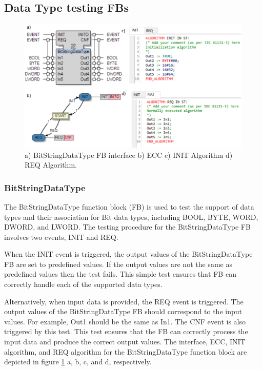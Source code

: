 \documentclass[conference]{IEEEtran}
\begin{document}
\subsection{Data Type testing FBs}
\begin{figure}[!b]
    \centering
    \includegraphics[width=\columnwidth]{Figures/BSDT.PNG}
    \caption{a) BitStringDataType FB interface b) ECC c) INIT Algorithm d) REQ Algorithm.} 
    \label{fig:BSDT}
\end{figure}



\subsubsection{BitStringDataType}

The BitStringDataType function block (FB) is used to test the support of data types and their association for Bit data types, including BOOL, BYTE, WORD, DWORD, and LWORD. The testing procedure for the BitStringDataType FB involves two events, INIT and REQ.

When the INIT event is triggered, the output values of the BitStringDataType FB are set to predefined values. If the output values are not the same as  predefined values then the test fails. This simple test ensures that FB can correctly handle each of the supported data types.

Alternatively, when input data is provided, the REQ event is triggered. The output values of the BitStringDataType FB should correspond to the input values. For example, Out1 should be the same as In1. The CNF event is also triggered by this test. This test ensures that the FB can correctly process the input data and produce the correct output values. The interface, ECC, INIT algorithm, and REQ algorithm for the BitStringDataType function block are depicted in figure \ref{fig:BSDT} a, b, c, and d, respectively.
\end{document}
